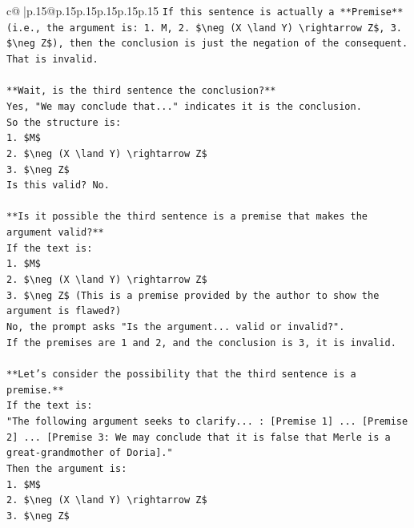 \documentclass{article}
\begin{document}
{\begin{supertabular}{c@{$\;$}|p{.15\linewidth}@{}p{.15\linewidth}p{.15\linewidth}p{.15\linewidth}p{.15\linewidth}p{.15\linewidth}}
{{{\texttt{If this sentence is actually a **Premise** (i.e., the argument is: 1. M, 2. \$\textbackslash{}neg (X \textbackslash{}land Y) \textbackslash{}rightarrow Z\$, 3. \$\textbackslash{}neg Z\$), then the conclusion is just the negation of the consequent. That is invalid.} \\
\\ 
\texttt{**Wait, is the third sentence the conclusion?**} \\
\texttt{Yes, "We may conclude that..." indicates it is the conclusion.} \\
\texttt{So the structure is:} \\
\texttt{1. \$M\$} \\
\texttt{2. \$\textbackslash{}neg (X \textbackslash{}land Y) \textbackslash{}rightarrow Z\$} \\
\texttt{3. \$\textbackslash{}neg Z\$} \\
\texttt{Is this valid? No.} \\
\\ 
\texttt{**Is it possible the third sentence is a premise that makes the argument valid?**} \\
\texttt{If the text is:} \\
\texttt{1. \$M\$} \\
\texttt{2. \$\textbackslash{}neg (X \textbackslash{}land Y) \textbackslash{}rightarrow Z\$} \\
\texttt{3. \$\textbackslash{}neg Z\$ (This is a premise provided by the author to show the argument is flawed?)} \\
\texttt{No, the prompt asks "Is the argument... valid or invalid?".} \\
\texttt{If the premises are 1 and 2, and the conclusion is 3, it is invalid.} \\
\\ 
\texttt{**Let's consider the possibility that the third sentence is a premise.**} \\
\texttt{If the text is:} \\
\texttt{"The following argument seeks to clarify... : {[}Premise 1{]} ... {[}Premise 2{]} ... {[}Premise 3: We may conclude that it is false that Merle is a great{-}grandmother of Doria{]}."} \\
\texttt{Then the argument is:} \\
\texttt{1. \$M\$} \\
\texttt{2. \$\textbackslash{}neg (X \textbackslash{}land Y) \textbackslash{}rightarrow Z\$} \\
\texttt{3. \$\textbackslash{}neg Z\$} \\
}}}
\end{supertabular}}
\end{document}
